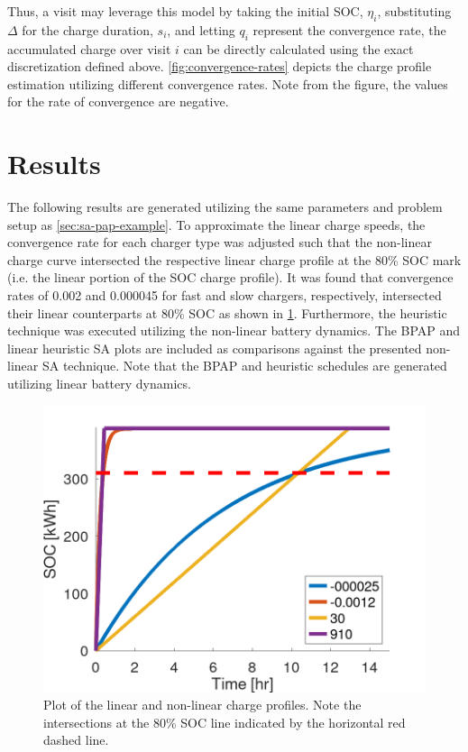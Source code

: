 \documentclass[ee,thesis]{usuthesis}
\begin{document}
Thus, a visit may leverage this model by taking the initial SOC, \(\eta_i\), substituting \(\Delta\) for the charge duration, \(s_i\),
and letting \(q_i\) represent the convergence rate, the accumulated charge over visit \(i\) can be directly calculated using
the exact discretization defined above. \ref{fig:convergence-rates} depicts the charge profile estimation utilizing
different convergence rates. Note from the figure, the values for the rate of convergence are negative.

\section{Results}
\label{sec:nonlinear-results}
The following results are generated utilizing the same parameters and problem setup as \ref{sec:sa-pap-example}. To
approximate the linear charge speeds, the convergence rate for each charger type was adjusted such that the non-linear
charge curve intersected the respective linear charge profile at the 80\% SOC mark (i.e. the linear portion of the SOC
charge profile). It was found that convergence rates of 0.002 and 0.000045 for fast and slow chargers, respectively,
intersected their linear counterparts at 80\% SOC as shown in \ref{fig:nonlinear-linear-match}. Furthermore, the heuristic
technique was executed utilizing the non-linear battery dynamics. The BPAP and linear heuristic SA plots are included as
comparisons against the presented non-linear SA technique. Note that the BPAP and heuristic schedules are generated
utilizing linear battery dynamics.


\begin{figure}[htbp]
\centering
\includegraphics[width=.9\linewidth]{img/nonlinear-bat-lin.png}
\caption{\label{fig:nonlinear-linear-match}Plot of the linear and non-linear charge profiles. Note the intersections at the 80\% SOC line indicated by the horizontal red dashed line.}
\end{figure}
\end{document}
